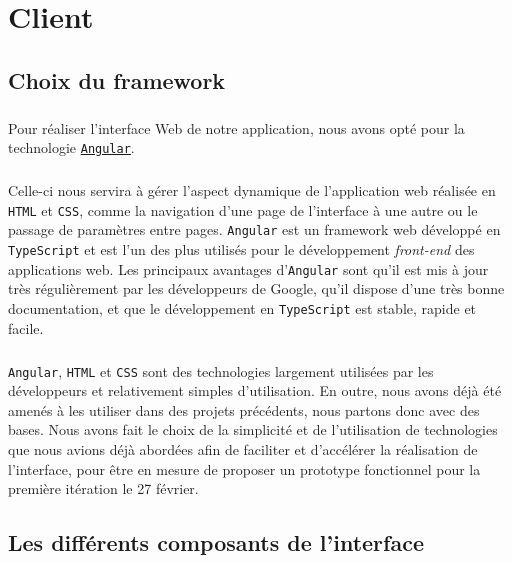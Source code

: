\chapter{Client}

\section{Choix du framework}

\paragraph{}
Pour réaliser l’interface Web de notre application, nous avons opté pour la technologie \href{https://angular.io/}{\texttt{Angular}}.

\paragraph{}
Celle-ci nous servira à gérer l’aspect dynamique de l’application web réalisée en \texttt{HTML} et \texttt{CSS}, comme la navigation d’une page de l’interface à une autre ou le passage de paramètres entre pages. \texttt{Angular} est un framework web développé en \texttt{TypeScript} et est l’un des plus utilisés pour le développement \textit{front-end} des applications web. Les principaux avantages d’\texttt{Angular} sont qu’il est mis à jour très régulièrement par les développeurs de Google, qu’il dispose d’une très bonne documentation, et que le développement en \texttt{TypeScript} est stable, rapide et facile.

\paragraph{}
\texttt{Angular}, \texttt{HTML} et \texttt{CSS} sont des technologies largement utilisées par les développeurs et relativement simples d’utilisation. En outre, nous avons déjà été amenés à les utiliser dans des projets précédents, nous partons donc avec des bases. Nous avons fait le choix de la simplicité et de l’utilisation de technologies que nous avions déjà abordées afin de faciliter et d’accélérer la réalisation de l’interface, pour être en mesure de proposer un prototype fonctionnel pour la première itération le 27 février.

\section{Les différents composants de l'interface}

